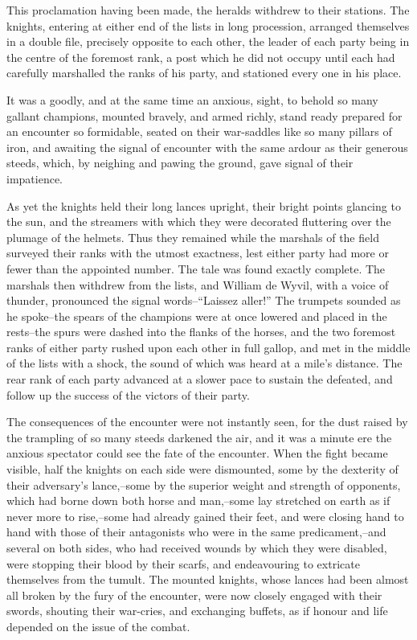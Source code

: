 This proclamation having been made, the heralds withdrew to their
stations. The knights, entering at either end of the lists in long
procession, arranged themselves in a double file, precisely opposite to
each other, the leader of each party being in the centre of the foremost
rank, a post which he did not occupy until each had carefully marshalled
the ranks of his party, and stationed every one in his place.

It was a goodly, and at the same time an anxious, sight, to behold so
many gallant champions, mounted bravely, and armed richly, stand ready
prepared for an encounter so formidable, seated on their war-saddles
like so many pillars of iron, and awaiting the signal of encounter with
the same ardour as their generous steeds, which, by neighing and pawing
the ground, gave signal of their impatience.

As yet the knights held their long lances upright, their bright points
glancing to the sun, and the streamers with which they were decorated
fluttering over the plumage of the helmets. Thus they remained while the
marshals of the field surveyed their ranks with the utmost exactness,
lest either party had more or fewer than the appointed number. The tale
was found exactly complete. The marshals then withdrew from the lists,
and William de Wyvil, with a voice of thunder, pronounced the signal
words--``Laissez aller!'' The trumpets sounded as he spoke--the spears
of the champions were at once lowered and placed in the rests--the spurs
were dashed into the flanks of the horses, and the two foremost ranks of
either party rushed upon each other in full gallop, and met in the
middle of the lists with a shock, the sound of which was heard at a
mile's distance. The rear rank of each party advanced at a slower pace
to sustain the defeated, and follow up the success of the victors of
their party.

The consequences of the encounter were not instantly seen, for the dust
raised by the trampling of so many steeds darkened the air, and it was a
minute ere the anxious spectator could see the fate of the encounter.
When the fight became visible, half the knights on each side were
dismounted, some by the dexterity of their adversary's lance,--some by
the superior weight and strength of opponents, which had borne down both
horse and man,--some lay stretched on earth as if never more to
rise,--some had already gained their feet, and were closing hand to hand
with those of their antagonists who were in the same predicament,--and
several on both sides, who had received wounds by which they were
disabled, were stopping their blood by their scarfs, and endeavouring to
extricate themselves from the tumult. The mounted knights, whose lances
had been almost all broken by the fury of the encounter, were now
closely engaged with their swords, shouting their war-cries, and
exchanging buffets, as if honour and life depended on the issue of the
combat.


